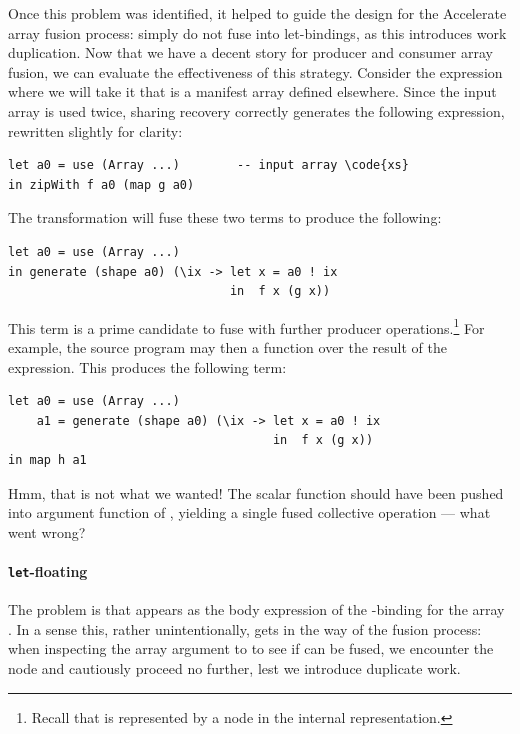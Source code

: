 Once this problem was identified, it helped to guide the design for the
Accelerate array fusion process: simply do not fuse into let-bindings,
as this introduces work duplication. Now that we have a decent story for
producer and consumer array fusion, we can evaluate the effectiveness of this
strategy. Consider the expression 
where we will take it that  is a manifest array defined elsewhere.
Since the input array  is used twice, sharing recovery correctly
generates the following expression, rewritten slightly for clarity:
%
\begin{lstlisting}[style=haskell]
let a0 = use (Array ...)        -- input array \code{xs}
in zipWith f a0 (map g a0)
\end{lstlisting}
%
The transformation will fuse these two terms to produce the following:
%
\begin{lstlisting}[style=haskell]
let a0 = use (Array ...)
in generate (shape a0) (\ix -> let x = a0 ! ix
                               in  f x (g x))
\end{lstlisting}
%
This  term is a prime candidate to fuse with further producer
operations.\footnote{Recall that  is represented by a
 node in the internal representation.} For example, the source
program may then  a function  over the result of the
 expression. This produces the following term:
%
\begin{lstlisting}[style=haskell]
let a0 = use (Array ...)
    a1 = generate (shape a0) (\ix -> let x = a0 ! ix
                                     in  f x (g x))
in map h a1
\end{lstlisting}
%
Hmm, that is not what we wanted! The scalar function  should have been
pushed into argument function of , yielding a single fused
collective operation --- what went wrong?

\paragraph{\texttt{\bf let}-floating}

The problem is that  appears as the body expression of the
-binding for the array . In a sense this, rather
unintentionally, gets in the way of the fusion process: when inspecting the
array argument to  to see if can be fused, we encounter the
 node and cautiously proceed no further, lest we introduce duplicate
work.

